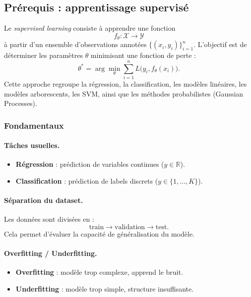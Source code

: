 \documentclass[11pt,a4paper]{article}
\newcommand{\1}{\mathbf{1}}
\begin{document}
\subsection{Pr\'erequis : apprentissage supervis\'e}

Le \emph{supervised learning} consiste à apprendre une fonction
\[
f_\theta : \mathcal{X} \to \mathcal{Y}
\]
à partir d'un ensemble d'observations annotées
$\{(x_i,y_i)\}_{i=1}^n$.
L'objectif est de déterminer les paramètres $\theta$ minimisant une fonction de
perte :
\[
\theta^*
=
\arg\min_\theta
\sum_{i=1}^{n}
L\bigl(y_i, f_\theta(x_i)\bigr).
\]
Cette approche regroupe la régression, la classification, les modèles linéaires,
les modèles arborescents, les SVM, ainsi que les méthodes probabilistes
(Gaussian Processes).

\subsubsection{Fondamentaux}

\paragraph{Tâches usuelles.}

\begin{itemize}
  \item \textbf{Régression} : prédiction de variables continues ($y \in \mathbb{R}$).
  \item \textbf{Classification} : prédiction de labels discrets
        ($y \in \{1,\dots,K\}$).
\end{itemize}

\paragraph{Séparation du dataset.}

Les données sont divisées en :
\[
\text{train} \longrightarrow \text{validation} \longrightarrow \text{test}.
\]
Cela permet d'évaluer la capacité de généralisation du modèle.

\paragraph{Overfitting / Underfitting.}

\begin{itemize}
  \item \textbf{Overfitting} : modèle trop complexe, apprend le bruit.
  \item \textbf{Underfitting} : modèle trop simple, structure insuffisante.
\end{itemize}
\end{document}
